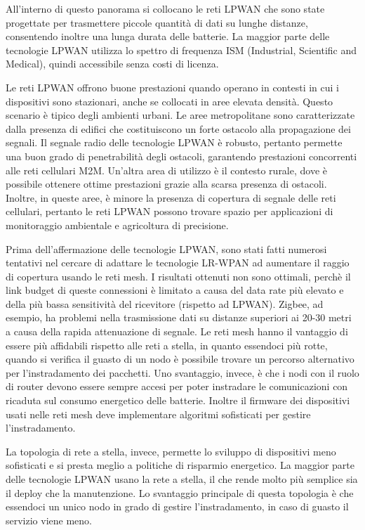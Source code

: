 \documentclass[12pt,a4paper,openright,twoside]{report}
\begin{document}
All'interno di questo panorama si collocano le reti LPWAN che sono state progettate per trasmettere piccole quantit\`a di dati su lunghe distanze, consentendo inoltre una lunga durata delle batterie. 
La maggior parte delle tecnologie LPWAN utilizza lo spettro di frequenza ISM  (Industrial, Scientific and Medical), quindi accessibile senza costi di licenza.


Le reti LPWAN offrono buone prestazioni quando operano in contesti in cui i dispositivi sono stazionari, anche se collocati in aree elevata densit\`a. Questo scenario \`e tipico degli ambienti urbani.
Le aree metropolitane sono caratterizzate dalla presenza di edifici che costituiscono un forte ostacolo alla propagazione dei segnali. 
Il segnale radio delle tecnologie LPWAN \`e robusto, pertanto permette una buon grado di penetrabilit\`a degli ostacoli, garantendo prestazioni concorrenti alle reti cellulari M2M. 
Un'altra area di utilizzo \`e il contesto rurale, dove \`e possibile ottenere ottime prestazioni grazie alla scarsa presenza di ostacoli. 
Inoltre, in queste aree, \`e minore la presenza di copertura di segnale delle reti cellulari, pertanto le reti LPWAN possono trovare spazio per applicazioni di monitoraggio ambientale e agricoltura di precisione.  
     
Prima dell'affermazione delle tecnologie LPWAN, sono stati fatti numerosi tentativi nel cercare di adattare le tecnologie LR-WPAN ad aumentare il raggio di copertura usando le reti mesh.
I risultati ottenuti non sono ottimali, perch\`e il link budget di queste connessioni \`e limitato a causa del data rate pi\`u elevato e della pi\`u bassa sensitivit\`a del ricevitore (rispetto ad LPWAN).
Zigbee, ad esempio, ha problemi nella trasmissione dati su distanze superiori ai 20-30 metri a causa della rapida attenuazione di segnale. 
Le reti mesh hanno il vantaggio di essere pi\`u affidabili rispetto alle reti a stella, in quanto essendoci pi\`u rotte, quando si verifica il guasto di un nodo \`e possibile trovare un percorso alternativo per l'instradamento dei pacchetti. 
Uno svantaggio, invece, \`e che i nodi con il ruolo di router devono essere sempre accesi per poter instradare le comunicazioni con ricaduta sul consumo energetico delle batterie. 
Inoltre il firmware dei dispositivi usati nelle reti mesh deve implementare algoritmi sofisticati per gestire l'instradamento. 

La topologia di rete a stella, invece, permette lo sviluppo di dispositivi meno sofisticati e si presta meglio a politiche di risparmio energetico.
La maggior parte delle tecnologie LPWAN usano la rete a stella, il che rende molto pi\`u semplice sia il deploy che la manutenzione. 
Lo svantaggio principale di questa topologia \`e che essendoci un unico nodo in grado di gestire l'instradamento, in caso di guasto il servizio viene meno.
\end{document}
